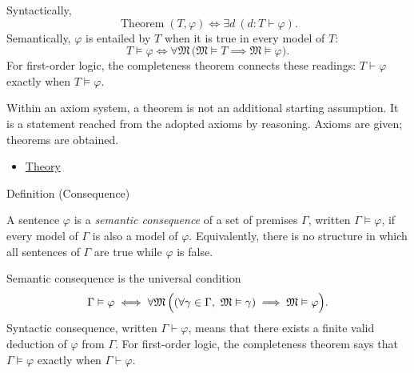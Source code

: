 \begin{remark*}
Syntactically,
\[
  \operatorname{Theorem}(T,\varphi)
  \iff \exists d\ (d:T\vdash\varphi).
\]
Semantically, $\varphi$ is entailed by $T$ when it is true in every model of
$T$:
\[
  T\vDash\varphi
  \iff
  \forall\mathfrak{M}\,
  \bigl(\mathfrak{M}\vDash T \implies \mathfrak{M}\vDash\varphi\bigr).
\]
For first-order logic, the completeness theorem connects these readings:
$T\vdash\varphi$ exactly when $T\vDash\varphi$.
\end{remark*}

\begin{remark*}[Interpretation]
Within an axiom system, a theorem is not an additional starting assumption. It
is a statement reached from the adopted axioms by reasoning. Axioms are given;
theorems are obtained.
\end{remark*}

\begin{dependencies}
\begin{itemize}
  \item \hyperref[def:axiom-systems-theory]{Theory}
\end{itemize}
\end{dependencies}

\begin{definitionbox}{Definition (Consequence)}
\begin{definition}[Consequence]
\label{def:axiom-systems-consequence}
A sentence $\varphi$ is a \emph{semantic consequence} of a set of premises
$\Gamma$, written $\Gamma\vDash\varphi$, if every model of $\Gamma$ is also a
model of $\varphi$. Equivalently, there is no structure in which all sentences
of $\Gamma$ are true while $\varphi$ is false.
\end{definition}
\end{definitionbox}

\begin{remark*}
Semantic consequence is the universal condition
\[
  \Gamma\vDash\varphi
  \iff
  \forall\mathfrak{M}\,
  \Bigl(
    (\forall\gamma\in\Gamma,\ \mathfrak{M}\vDash\gamma)
    \implies
    \mathfrak{M}\vDash\varphi
  \Bigr).
\]
Syntactic consequence, written $\Gamma\vdash\varphi$, means that there exists
a finite valid deduction of $\varphi$ from $\Gamma$. For first-order logic,
the completeness theorem says that $\Gamma\vDash\varphi$ exactly when
$\Gamma\vdash\varphi$.
\end{remark*}

